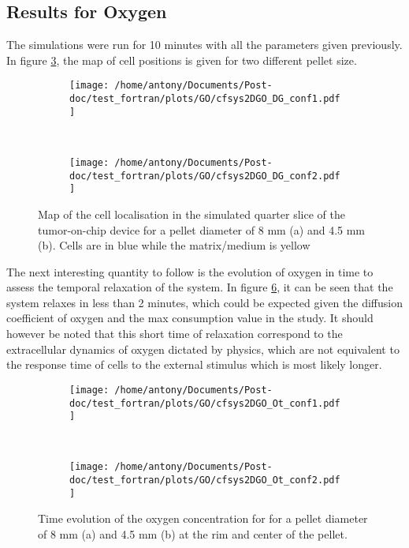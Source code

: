 \documentclass[11pt,a4paper]{article}
\begin{document}
\subsection{Results for Oxygen}
The simulations were run for 10 minutes with all the parameters given previously. In figure \ref{DG_map}, the map of cell positions is given for two different pellet size.  \\

\begin{figure}[ht!]
	\begin{subfigure}{0.45\textwidth}
	\centering
	\texttt{[image: /home/antony/Documents/Post-doc/test\_fortran/plots/GO/cfsys2DGO\_DG\_conf1.pdf]}
	\caption{ \label{DG_conf1}}
	\end{subfigure}
	~~
	\begin{subfigure}{0.45\textwidth}
	\texttt{[image: /home/antony/Documents/Post-doc/test\_fortran/plots/GO/cfsys2DGO\_DG\_conf2.pdf]}
		\caption{ \label{DG_conf2}}
	\end{subfigure}
	\caption{Map of the cell localisation in the simulated quarter slice of the tumor-on-chip device for a pellet diameter of 8 mm (a) and 4.5 mm (b). Cells are in blue while the matrix/medium is yellow \label{DG_map}}
\end{figure}
	
The next interesting quantity to follow is the evolution of oxygen in time to assess the temporal relaxation of the system. In figure \ref{Ot}, it can be seen that the system relaxes in less than 2 minutes, which could be expected given the diffusion coefficient of oxygen and the max consumption value in the study. It should however be noted that this short time of relaxation correspond to the extracellular dynamics of oxygen dictated by physics, which are not equivalent to the response time of cells to the external stimulus which is most likely longer.\\
 
\begin{figure}[ht!]
	\begin{subfigure}{0.45\textwidth}
	\centering
	\texttt{[image: /home/antony/Documents/Post-doc/test\_fortran/plots/GO/cfsys2DGO\_Ot\_conf1.pdf]}
	\caption{ \label{Ot_conf1}}
	\end{subfigure}
	~~
	\begin{subfigure}{0.45\textwidth}
	\texttt{[image: /home/antony/Documents/Post-doc/test\_fortran/plots/GO/cfsys2DGO\_Ot\_conf2.pdf]}
		\caption{ \label{Ot_conf2}}
	\end{subfigure}
	\caption{Time evolution of the oxygen concentration for for a pellet diameter of 8 mm (a) and 4.5 mm (b) at the rim and center of the pellet. \label{Ot}}
\end{figure}
\end{document}
